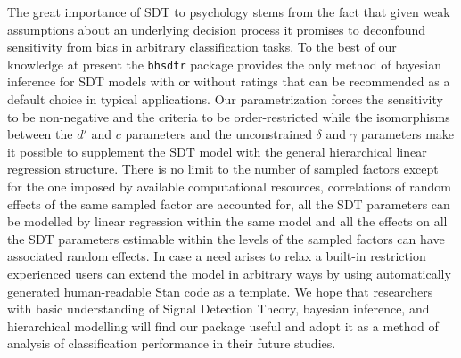 \documentclass[oneside,a4paper]{article}
\begin{document}
The great importance of SDT to psychology stems from the fact that
given weak assumptions about an underlying decision process it
promises to deconfound sensitivity from bias in arbitrary
classification tasks. To the best of our knowledge at present the
\texttt{bhsdtr} package provides the only method of bayesian inference
for SDT models with or without ratings that can be recommended as a
default choice in typical applications. Our parametrization forces the
sensitivity to be non-negative and the criteria to be order-restricted
while the isomorphisms between the $d'$ and $c$ parameters and the
unconstrained $\delta$ and $\gamma$ parameters make it possible to
supplement the SDT model with the general hierarchical linear
regression structure. There is no limit to the number of sampled
factors except for the one imposed by available computational
resources, correlations of random effects of the same sampled factor
are accounted for, all the SDT parameters can be modelled by linear
regression within the same model and all the effects on all the SDT
parameters estimable within the levels of the sampled factors can have
associated random effects. In case a need arises to relax a built-in
restriction experienced users can extend the model in arbitrary ways
by using automatically generated human-readable Stan code as a
template. We hope that researchers with basic understanding of Signal
Detection Theory, bayesian inference, and hierarchical modelling will
find our package useful and adopt it as a method of analysis of
classification performance in their future studies.



\end{document}

